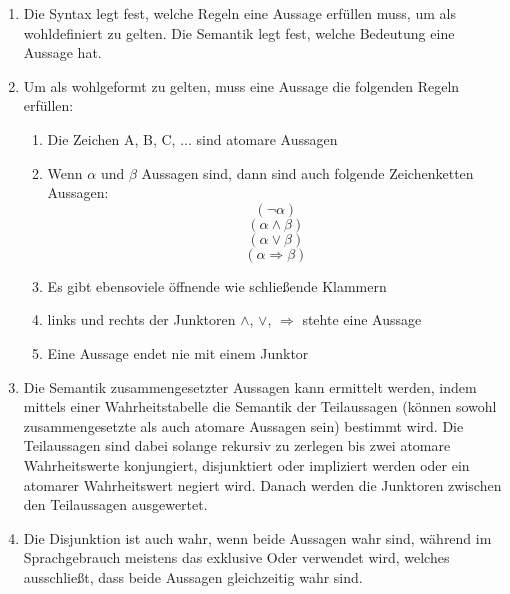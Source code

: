 \documentclass[a4paper]{article}
\begin{document}
\begin{enumerate}
		\item
		Die Syntax legt fest, welche Regeln eine Aussage erfüllen muss, um als wohldefiniert zu gelten. Die Semantik legt fest, welche Bedeutung eine Aussage hat.
		
		\item
		Um als wohlgeformt zu gelten, muss eine Aussage die folgenden Regeln erfüllen:
		\begin{enumerate}
			\item Die Zeichen A, B, C, ... sind atomare Aussagen
			
			\item Wenn $\alpha$ und $\beta$ Aussagen sind, dann sind auch folgende Zeichenketten Aussagen:
			\begin{equation*}
				(\lnot \alpha)
			\end{equation*}
			\begin{equation*}
				(\alpha \land \beta)
			\end{equation*}
			\begin{equation*}
				(\alpha \lor \beta)
			\end{equation*}
			\begin{equation*}
				(\alpha \Rightarrow \beta)
			\end{equation*}
			
			\item Es gibt ebensoviele öffnende wie schließende Klammern
			\item links und rechts der Junktoren $\land$, $\lor$, $\Rightarrow$ stehte eine Aussage
			\item Eine Aussage endet nie mit einem Junktor
		\end{enumerate}
		
		\item
		Die Semantik zusammengesetzter Aussagen kann ermittelt werden, indem mittels einer Wahrheitstabelle die Semantik der Teilaussagen (können sowohl zusammengesetzte als auch atomare Aussagen sein) bestimmt wird. Die Teilaussagen sind dabei solange rekursiv zu zerlegen bis zwei atomare Wahrheitswerte konjungiert, disjunktiert oder impliziert werden oder ein atomarer Wahrheitswert negiert wird. Danach werden die Junktoren zwischen den Teilaussagen ausgewertet.
		
		\item
		Die Disjunktion ist auch wahr, wenn beide Aussagen wahr sind, während im Sprachgebrauch meistens das exklusive Oder verwendet wird, welches ausschließt, dass beide Aussagen gleichzeitig wahr sind.
		

\end{enumerate}
\end{document}
